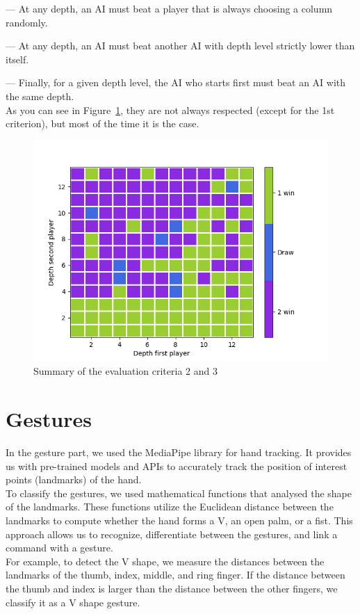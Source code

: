 \documentclass[11pt, a4paper, oneside]{report}
\begin{document}
	— At any depth, an AI must beat a player that is always choosing a column randomly.

	— At any depth, an AI must beat another AI with depth level strictly lower than itself.

	— Finally, for a given depth level, the AI who starts first must beat an AI with the same depth. \\

	As you can see in Figure~\ref{fig:summary_criteria}, they are not always respected (except for the 1st criterion), but most of the time it is the case.
	\begin{figure}[ht]
		\includegraphics[scale=0.7]{result_criteria.png}
		\centering
		\caption{Summary of the evaluation criteria 2 and 3}\label{fig:summary_criteria}
	\end{figure}

	\section{Gestures}
	In the gesture part, we used the MediaPipe library for hand tracking. It provides us with pre-trained models and APIs to accurately track the position of interest points (landmarks) of the hand. \\

	To classify the gestures, we used mathematical functions that analysed the shape of the landmarks. These functions utilize the Euclidean distance between the landmarks to compute whether the hand forms a V, an open palm, or a fist. This approach allows us to recognize, differentiate between the gestures, and link a command with a gesture. \\
	For example, to detect the V shape, we measure the distances between the landmarks of the thumb, index, middle, and ring finger. If the distance between the thumb and index is larger than the distance between the other fingers, we classify it as a V shape gesture. \\
\end{document}
